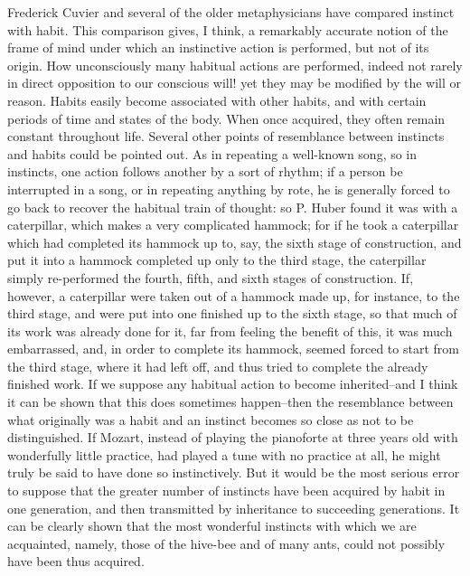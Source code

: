 Frederick Cuvier and several of the older metaphysicians have compared instinct with habit. This comparison gives, I think, a remarkably accurate notion of the frame of mind under which an instinctive action is performed, but not of its origin. How unconsciously many habitual actions are performed, indeed not rarely in direct opposition to our conscious will! yet they may be modified by the will or reason. Habits easily become associated with other habits, and with certain periods of time and states of the body. When once acquired, they often remain constant throughout life. Several other points of resemblance between instincts and habits could be pointed out. As in repeating a well-known song, so in instincts, one action follows another by a sort of rhythm; if a person be interrupted in a song, or in repeating anything by rote, he is generally forced to go back to recover the habitual train of thought: so P. Huber found it was with a caterpillar, which makes a very complicated hammock; for if he took a caterpillar which had completed its hammock up to, say, the sixth stage of construction, and put it into a hammock completed up only to the third stage, the caterpillar simply re-performed the fourth, fifth, and sixth stages of construction. If, however, a caterpillar were taken out of a hammock made up, for instance, to the third stage, and were put into one finished up to the sixth stage, so that much of its work was already done for it, far from feeling the benefit of this, it was much embarrassed, and, in order to complete its hammock, seemed forced to start from the third stage, where it had left off, and thus tried to complete the already finished work. If we suppose any habitual action to become inherited--and I think it can be shown that this does sometimes happen--then the resemblance between what originally was a habit and an instinct becomes so close as not to be distinguished. If Mozart, instead of playing the pianoforte at three years old with wonderfully little practice, had played a tune with no practice at all, he might truly be said to have done so instinctively. But it would be the most serious error to suppose that the greater number of instincts have been acquired by habit in one generation, and then transmitted by inheritance to succeeding generations. It can be clearly shown that the most wonderful instincts with which we are acquainted, namely, those of the hive-bee and of many ants, could not possibly have been thus acquired.

